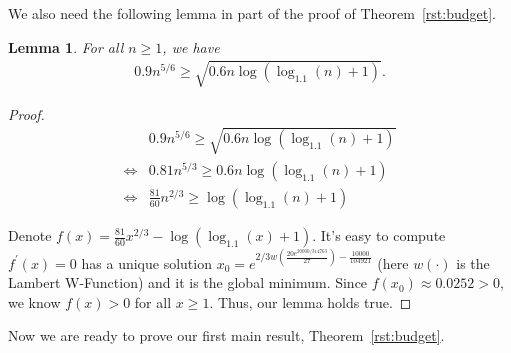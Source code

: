 \documentclass{article}
\newtheorem{lemma}{Lemma}
\begin{document}
We also need the following lemma in part of the proof of Theorem~\ref{rst:budget}.
\begin{lemma}
For all $n\geq 1$, we have
\begin{align}
0.9n^{5/6} \geq \sqrt{0.6n \log(\log_{1.1}(n)+1)}. \nonumber
\end{align}
\label{lemma:cal2}
\end{lemma}
\begin{proof}
\begin{align}
&0.9n^{5/6} \geq \sqrt{0.6n \log(\log_{1.1}(n)+1)} \nonumber \\
\iff & 0.81 n^{5/3} \geq 0.6n \log(\log_{1.1}(n)+1) \nonumber \\
\iff &  \frac{81}{60} n^{2/3} \geq  \log(\log_{1.1}(n)+1) \nonumber
\end{align}

Denote $f(x) = \frac{81}{60}x^{2/3} - \log(\log_{1.1}(x)+1)$. It's easy to compute $f^{'}(x)=0$ has a unique solution $x_{0}=e^{2/3w(\frac{20e^{20000/314763}}{27})-\frac{10000}{104921}}$ (here $w(\cdot)$ is the Lambert W-Function) and it is the global minimum. Since $f(x_{0})\approx 0.0252 >0$, we know $f(x)>0$ for all $x\geq 1$. Thus, our lemma holds true.
\end{proof}


Now we are ready to prove our first main result, Theorem~\ref{rst:budget}.
\end{document}
